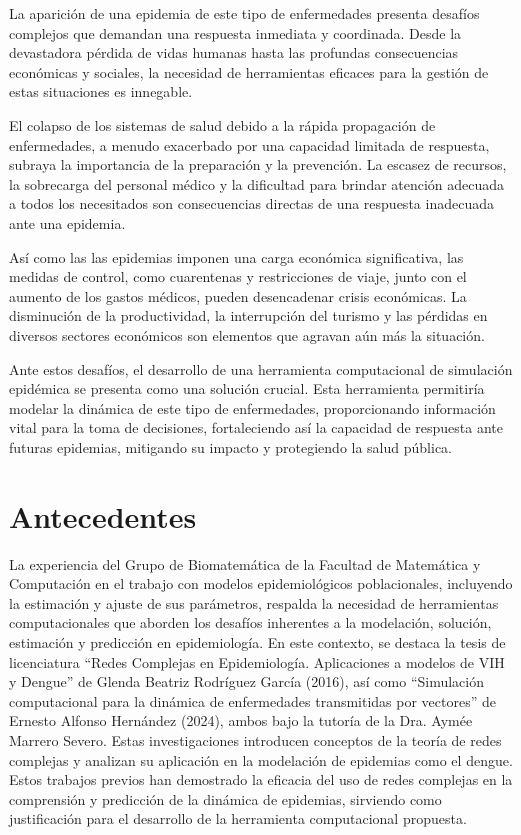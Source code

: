 La aparición de una epidemia de este tipo de enfermedades
presenta desafíos complejos que demandan una respuesta 
inmediata y coordinada.  Desde la devastadora 
pérdida de vidas humanas hasta las profundas 
consecuencias económicas y sociales, la necesidad de 
herramientas eficaces para la gestión de estas 
situaciones es innegable.

El colapso de los sistemas de salud debido a la rápida 
propagación de enfermedades, a menudo exacerbado 
por una capacidad limitada de respuesta, subraya 
la importancia de la preparación y la prevención.  
La escasez de recursos, la sobrecarga del personal 
médico y la dificultad para brindar atención 
adecuada a todos los necesitados son consecuencias 
directas de una respuesta inadecuada ante una 
epidemia.

As\'i como las las epidemias imponen una carga 
económica significativa, las medidas de control, 
como cuarentenas y restricciones de viaje, junto 
con el aumento de los gastos médicos, pueden 
desencadenar crisis económicas.  La disminución de 
la productividad, la interrupción del turismo y 
las pérdidas en diversos sectores económicos son 
elementos que agravan aún más la situación.

Ante estos desafíos, el desarrollo de una herramienta 
computacional de simulación epidémica se presenta 
como una solución crucial. Esta herramienta permitiría 
modelar la dinámica de este tipo de enfermedades, 
proporcionando información vital para la toma de 
decisiones, fortaleciendo as\'i la capacidad de 
respuesta ante futuras 
epidemias, mitigando su impacto y protegiendo la 
salud pública.


\section{Antecedentes}
La experiencia del Grupo de Biomatemática de la 
Facultad de Matemática y Computación en el trabajo 
con modelos epidemiológicos poblacionales, incluyendo 
la estimación y ajuste de sus parámetros, respalda 
la necesidad de herramientas computacionales que 
aborden los desafíos inherentes a la modelación, 
solución, estimación y predicción en epidemiología. 
En este contexto, se destaca la tesis de licenciatura 
``Redes Complejas en Epidemiología. Aplicaciones a 
modelos de VIH y Dengue'' de Glenda Beatriz Rodríguez 
García (2016), as\'i como ``Simulación computacional para la
dinámica de enfermedades transmitidas
por vectores'' de Ernesto Alfonso Hern\'andez (2024), ambos bajo
la tutor\'ia de la Dra. Aymée Marrero Severo. Estas investigaciones 
introducen conceptos 
de la teoría de redes complejas y analizan su 
aplicación en la modelación de epidemias como el  
dengue. Estos trabajos previos han demostrado la 
eficacia del uso de redes complejas en la comprensión 
y predicción de la dinámica de epidemias,
sirviendo como justificación para el 
desarrollo de la herramienta computacional propuesta.

